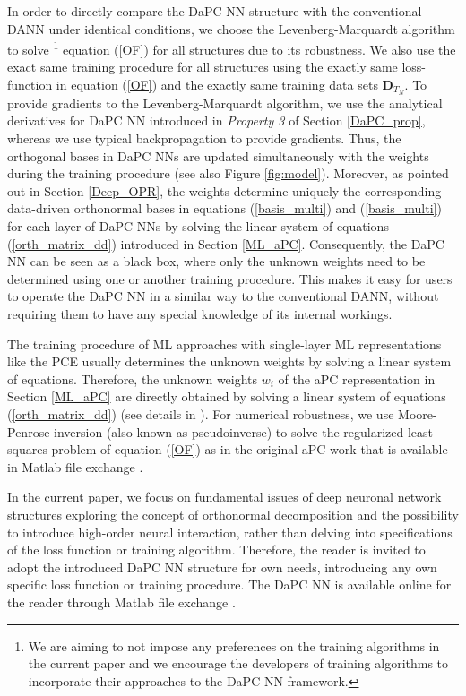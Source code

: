 \documentclass[a4paper,fleqn]{article}
\newcommand{\rw}[1]{\textcolor{blue}{#1}}
\newcommand{\del}[1]{\textcolor{red}{\sout{#1}}}
\renewcommand{\del}[1]{}
\renewcommand{\rw}[1]{#1}
\begin{document}
In order to directly compare the DaPC NN structure with the conventional DANN under identical conditions, we choose the Levenberg-Marquardt algorithm \cite{marquardt1963} to solve \rw{\footnote{We are aiming to not impose any preferences on the training algorithms in the current paper and we encourage the developers of training algorithms to incorporate their approaches to the DaPC NN framework.}} equation (\ref{OF}) for all structures due to its robustness. We also use the exact same training procedure for all structures using the exactly same loss-function in equation (\ref{OF}) and the exactly same training data sets $\bm{D}_{T_N}$. To provide gradients to the Levenberg-Marquardt algorithm, we use the analytical derivatives for DaPC NN introduced in \textit{Property 3} of Section \ref{DaPC_prop}, whereas we use typical backpropagation to provide gradients. \rw{Thus, the orthogonal bases in DaPC NNs are updated simultaneously with the weights during the training procedure (see also Figure \ref{fig:model}). Moreover, as pointed out in Section \ref{Deep_OPR}, the weights determine uniquely the corresponding data-driven orthonormal bases in equations (\ref{basis_multi}) and (\ref{basis_multi}) for each layer of DaPC NNs by solving the linear system of equations (\ref{orth_matrix_dd}) introduced in Section \ref{ML_aPC}. Consequently, the DaPC NN can be seen as a black box, where only the unknown weights need to be determined using one or another training procedure. This makes it easy for users to operate the DaPC NN in a similar way to the conventional DANN, without requiring them to have any special knowledge of its internal workings.}

The training procedure of ML approaches with single-layer ML representations \cite{deng2011an} like the PCE usually determines the unknown weights by solving a linear system of equations. Therefore, the unknown weights $w_{i}$ of the aPC representation in Section \ref{ML_aPC} are directly obtained by solving a linear system of equations (\ref{orth_matrix_dd}) (see details in \rw{\cite{Olad_al_CG2009,augustin2008pc,atkinson1992optimum}}). For numerical robustness, we use Moore-Penrose inversion \cite{moore1920reciprocal,penrose1956best, barata2012moore} (also known as pseudoinverse) to solve the regularized \cite{tikhonov1977solutions} least-squares problem of equation (\ref{OF}) as in the original aPC work \cite{OladNowak_RESS2012} that is available in Matlab \rw{file} exchange \cite{aPC_Toolbox}.

In the current paper, we \del{minimize speculations about the loss function and } focus on fundamental issues of deep neuronal network structures exploring the concept of orthonormal decomposition and the possibility to introduce high-order neural interaction, \rw{rather than delving into specifications of the loss function or training algorithm.}  Therefore, the reader is invited to adopt the introduced DaPC NN structure for own needs, introducing any own specific loss function or training procedure. The DaPC NN is available online for the reader through Matlab file exchange \cite{DaPC-NN_Toolbox}.
\end{document}
